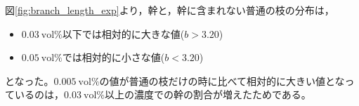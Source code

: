 \documentclass[autodetect-engine,dvi=dvipdfmx,a4paper,ja=standard,oneside,openany,11pt]{bxjsbook}
\begin{document}
図\ref{fig:branch_length_exp}より，幹と，幹に含まれない普通の枝の分布は，
\begin{itemize}
  \item $\SI{0.03}{\mathrm{vol}\%}$以下では相対的に大きな値($b>3.20$)
  \item $\SI{0.05}{\mathrm{vol}\%}$では相対的に小さな値($b<3.20$)
\end{itemize}
となった。$\SI{0.005}{\mathrm{vol}\%}$の値が普通の枝だけの時に比べて相対的に大きい値となっているのは，$\SI{0.03}{\mathrm{vol}\%}$以上の濃度での幹の割合が増えたためである。
\ifdraft{
  
  
}{}
\end{document}
